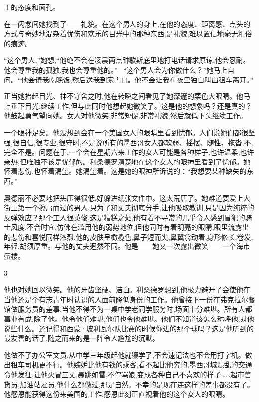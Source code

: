 \documentclass{ctexart}
\renewcommand{\\}{\par}
\begin{document}
工的态度和面孔。\\在一闪念间她找到了——礼貌。在这个男人的身上,在他的态度、距离感、点头的方式与奇妙地混杂着忧伤和欢乐的目光中的那种东西,是礼貌,难以置信地毫无粗俗的痕迹。 \\“这个男人,”她想,“他绝不会在凌晨两点钟歇斯底里地打电话请求原谅,他会忍耐。他会尊重我的孤独,我也会尊重他的。” \ “这个男人会为你做什么？”她马上自问。“他会请我吃晚饭,然后送我到家门口。他不会让我在夜里独自叫出租车离开。” \\正当她抬起目光、神不守舍之时,他在转瞬之间看见了她深邃的栗色大眼睛。他马上垂下目光,继续工作,但与此同时他想起她微笑了。这是他的想象吗？还是真的？他鼓起勇气望向她。女人对他微笑,非常短促,非常礼貌,然后就低下头继续工作。\\一个眼神足矣。他没想到会在一个美国女人的眼睛里看到忧郁。人们说她们都很坚强,很自信,很专业,很守时,不是说所有的墨西哥女人都软弱、摇摆、随性、拖沓,不,完全不是。问题在于,一个会在星期六来工作的女人可能是各种样子,也许温柔,也许亲热,但唯独不该是忧郁的。利桑德罗清楚地在这个女人的眼神里看到了忧郁。她怀着悲伤,也怀着渴望。她渴望着。这是她的眼神所诉说的：“我想要某种缺失的东西。” \\奥德丽不必要地把头压得很低,好躲进纸张文件中。这太荒唐了。她难道要爱上大街上第一个擦肩而过的男人,只为了和丈夫彻底分手,让他吸取教训,只是因为纯粹的反弹效应？那个工人很英俊,这是糟糕之处,他有着不寻常的几乎令人感到冒犯的骑士风度,不合时宜,仿佛在滥用他的弱势地位,但他同时有着明亮的眼睛,眼里流露出的悲伤和喜悦同样浓烈,他的皮肤呈橄榄色,鼻子短而尖,鼻翼翕动着,身形修长,卷发,年轻,胡须厚重。与他的丈夫迥然不同。他是——她又一次露出微笑——一个海市蜃楼。 \\ \begin{center} 3 \end{center} \\他也对她回以微笑。他的牙齿坚硬、洁白。利桑德罗想到,他极力避开了会使他在当他还是个有志青年时认识的人面前降低身份的工作。他曾接下一份在弗克拉尔餐馆做服务员的差事,当他不得不为一桌中学老同学服务时,场面十分难堪。所有人都事业有成,除了他。他令他们难堪,他们也令他难堪。他们不知道该怎么称呼他,对他说些什么。还记得和西蒙·玻利瓦尔队比赛的时候你进的那个球吗？这是他听到的最友善的话了,随之而来的是一阵令人尴尬的沉默。 \\他做不了办公室文员,从中学三年级起他就辍学了,不会速记法也不会用打字机。做出租车司机更不行。他嫉妒比他有钱的乘客,看不起比他穷的,墨西哥城混乱的交通令他发狂,让他火冒三丈,暴跳如雷,不停骂娘,变成各种自己不喜欢的样子……超市售货员,加油站雇员,他什么都做过,那是自然。不幸的是现在连这样的差事都没有了。他感恩能获得这份来美国的工作,感恩此刻正直视着他的这个女人的眼睛。 
\end{document}
